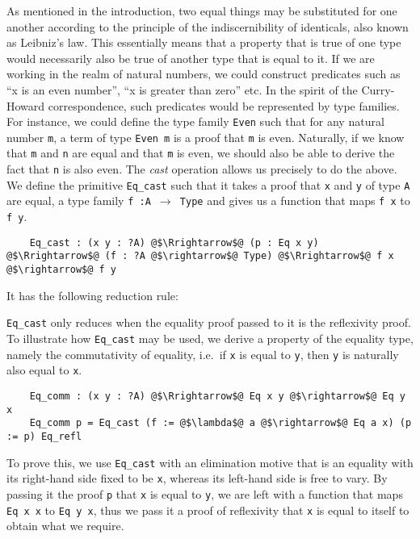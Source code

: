 \documentclass[12pt,twoside,maitrise]{dms}
\theoremstyle{definition}
\numberwithin{equation}{section}
\numberwithin{table}{chapter}
\numberwithin{figure}{chapter}
\newcommand\id[1] {\texttt{#1}}
\newcommand\fn[1] {\texttt{#1}}
\begin{document}
As mentioned in the introduction, two equal things may be substituted for one
another according to the principle of the indiscernibility of identicals, also
known as Leibniz's law. This essentially means that a property that is true of
one type would necessarily also be true of another type that is equal to it. If
we are working in the realm of natural numbers, we could construct predicates
such as ``x is an even number'', ``x is greater than zero'' etc. In the spirit
of the Curry-Howard correspondence, such predicates would be represented by type
families. For instance, we could define the type family \id{Even} such that for
any natural number \id{m}, a term of type \fn{Even m} is a proof that \id{m} is
even. Naturally, if we know that \id{m} and \id{n} are equal and that \id{m} is
even, we should also be able to derive the fact that \id{n} is also even. The
\emph{cast} operation allows us precisely to do the above. We define the
primitive \id{Eq\_cast} such that it takes a proof that \id{x} and \id{y} of
type \id{A} are equal, a type family \fn{f :\@ A $\rightarrow$ Type} and
gives us a function that maps \fn{f x} to \fn{f y}.

\begin{verbatim}
    Eq_cast : (x y : ?A) @$\Rrightarrow$@ (p : Eq x y) @$\Rrightarrow$@ (f : ?A @$\rightarrow$@ Type) @$\Rrightarrow$@ f x @$\rightarrow$@ f y
\end{verbatim}

It has the following reduction rule:

\begin{prooftree*}
  \hypo{\id{p} \simeq{} \id{Eq\_refl}}
  \infer1{\Funapp{\id{Eq\_cast}}{\id{x}}{\id{y}}{\id{p}}{\id{f}}{\id{fx}} \leadsto{} \id{fx}}
\end{prooftree*}

\id{Eq\_cast} only reduces when the equality proof passed to it is the
reflexivity proof. To illustrate how \id{Eq\_cast} may be used, we derive a
property of the equality type, namely the commutativity of equality, i.e.\ if
\id{x} is equal to \id{y}, then \id{y} is naturally also equal to \id{x}.

\begin{verbatim}
    Eq_comm : (x y : ?A) @$\Rrightarrow$@ Eq x y @$\rightarrow$@ Eq y x
    Eq_comm p = Eq_cast (f := @$\lambda$@ a @$\rightarrow$@ Eq a x) (p := p) Eq_refl
\end{verbatim}

To prove this, we use \id{Eq\_cast} with an elimination motive that is an
equality with its right-hand side fixed to be \id{x}, whereas its left-hand side
is free to vary. By passing it the proof \id{p} that \id{x} is equal to \id{y},
we are left with a function that maps \fn{Eq x x} to \fn{Eq y x}, thus we pass
it a proof of reflexivity that \id{x} is equal to itself to obtain what we
require.
\end{document}
